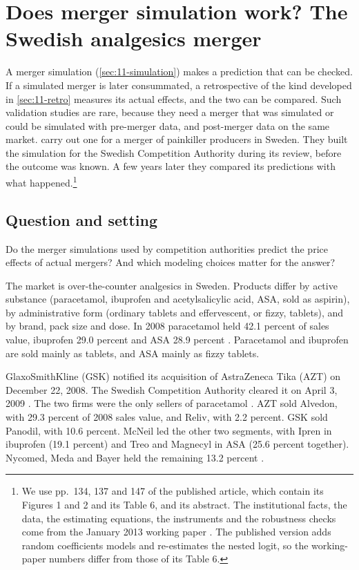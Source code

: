 \section{Does merger simulation work? The Swedish analgesics merger}\label{sec:11-bv}

A merger simulation (\cref{sec:11-simulation}) makes a prediction that can be checked. If a simulated merger is
later consummated, a retrospective of the kind developed in \cref{sec:11-retro} measures its actual effects, and the
two can be compared. Such validation studies are rare, because they need a merger that was simulated or could be
simulated with pre-merger data, and post-merger data on the same market. \citet{BjornerstedtVerboven2016} carry out
one for a merger of painkiller producers in Sweden. They built the simulation for the Swedish Competition Authority
during its review, before the outcome was known. A few years later they compared its predictions with what
happened.\footnote{We use pp.~134, 137 and 147 of the published article, which contain its Figures 1 and 2 and its
Table 6, and its abstract. The institutional facts, the data, the estimating equations, the instruments and the
robustness checks come from the January 2013 working paper \citep{BjornerstedtVerboven2013}. The published version
adds random coefficients models and re-estimates the nested logit, so the working-paper numbers differ from those of
its Table 6.}

\subsection{Question and setting}\label{sec:11-bv-setting}

 Do the merger simulations used by competition authorities predict the price effects of actual
mergers? And which modeling choices matter for the answer?

 The market is over-the-counter analgesics in Sweden. Products differ by active substance
(paracetamol, ibuprofen and acetylsalicylic acid, ASA, sold as aspirin), by administrative form (ordinary tablets
and effervescent, or fizzy, tablets), and by brand, pack size and dose. In 2008 paracetamol held 42.1 percent of
sales value, ibuprofen 29.0 percent and ASA 28.9 percent \citep[Table 1]{BjornerstedtVerboven2013}. Paracetamol and
ibuprofen are sold mainly as tablets, and ASA mainly as fizzy tablets.

GlaxoSmithKline (GSK) notified its acquisition of AstraZeneca Tika (AZT) on December 22, 2008. The Swedish
Competition Authority cleared it on April 3, 2009 \citep[p.~6]{BjornerstedtVerboven2013}. The two firms were the
only sellers of paracetamol \citep[p.~137]{BjornerstedtVerboven2016}. AZT sold Alvedon, with 29.3 percent of 2008
sales value, and Reliv, with 2.2 percent. GSK sold Panodil, with 10.6 percent. McNeil led the other two segments,
with Ipren in ibuprofen (19.1 percent) and Treo and Magnecyl in ASA (25.6 percent together). Nycomed, Meda and Bayer
held the remaining 13.2 percent \citep[Table 2]{BjornerstedtVerboven2013}.

